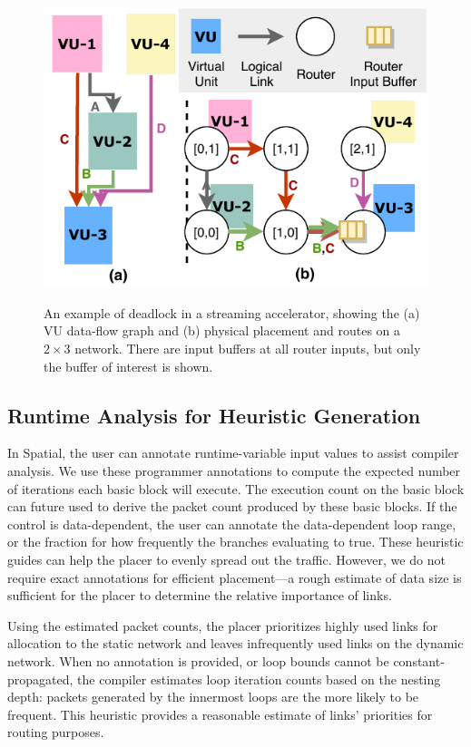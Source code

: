 \begin{figure}
\centering
\includegraphics[width=0.4\columnwidth]{figs/deadlock.pdf}
  \caption{An example of deadlock in a streaming accelerator, showing the (a) VU data-flow graph and (b) physical placement and routes on a $2\times3$ network. There are input buffers at all router inputs, but only the buffer of interest is shown.}\small\textsuperscript{}\label{fig:deadlock}
\end{figure}

\subsection{Runtime Analysis for Heuristic Generation} \label{sec:heuristic}

In Spatial, the user can annotate runtime-variable input values to assist compiler analysis.  
We use these programmer annotations to compute the expected number of iterations each basic block
will execute. 
The execution count on the basic block can future used to derive the packet count produced
by these basic blocks.
If the control is data-dependent, the user can annotate the data-dependent loop range, or the
fraction for how frequently the branches evaluating to true.
These heuristic guides can help the placer to evenly spread out the traffic.
However, we do not require exact annotations for efficient placement---a rough estimate of 
data size is sufficient for the placer to determine the relative importance of links.

Using the estimated packet counts, the placer prioritizes highly used links for allocation to the static network and leaves infrequently used links on the dynamic network. 
When no annotation is provided, or loop bounds cannot be constant-propagated, the compiler estimates
loop iteration counts based on the nesting depth: packets generated by the innermost loops are 
the more likely to be frequent.
This heuristic provides a reasonable estimate of links' priorities for routing purposes.

